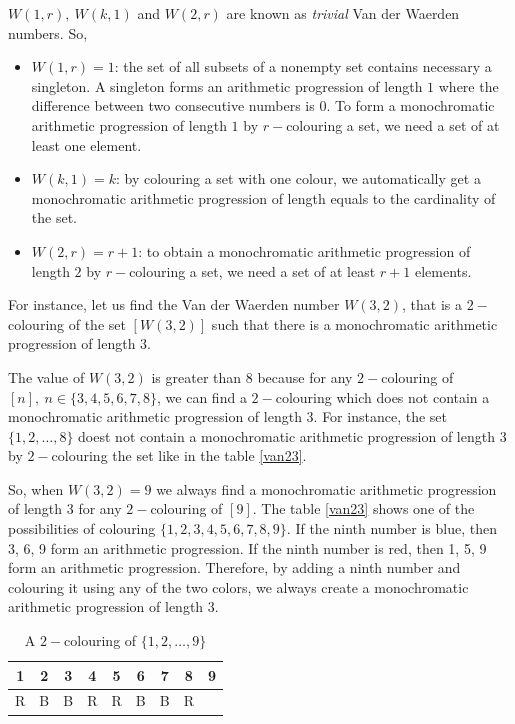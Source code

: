 $W(1,r), \ W(k,1)$ and $W(2,r)$ are known as \textit{trivial} Van der Waerden numbers. So, 
\begin{itemize}
\item $W(1,r)=1$:  the set of all subsets of a nonempty set contains necessary a singleton. A singleton forms an arithmetic progression of length $1$ where the difference between two consecutive numbers is $0.$ To form a monochromatic arithmetic progression of length $1$ by $r-$colouring a set, we need  a set of at least one element. 
\item $W(k,1)=k$: by colouring a set with one colour, we automatically get a monochromatic arithmetic progression of length equals to the cardinality  of the set.
\item $W(2,r)=r+1$: to obtain a monochromatic arithmetic progression of length $2$ by $r-$colouring a set, we need a set of at least $r+1$ elements.
\end{itemize}

For instance, let us find the Van der Waerden number $W(3,2)$, that is a $2-$colouring  of the set $[W(3,2)]$ such that there is a monochromatic arithmetic progression of length $3.$

The value of $W(3,2)$ is greater than $8$ because for any $2-$colouring of $[n],\ n\in \{3,4,5,6,7,8\}$, we can find a $2-$colouring which does not contain a monochromatic arithmetic progression of length 3. For instance, the set  $\{1,2,\ldots, 8\}$ doest not contain a monochromatic  arithmetic progression of length $3$ by $2-$colouring the set  like in the table \eqref{van23}.

So, when $W(3,2)=9$ we always find a monochromatic arithmetic progression of length 3 for any $2-$colouring of $[9].$ The table \eqref{van23} shows one of the possibilities of colouring $\{1,2,3,4,5,6,7,8,9\}.$  If the ninth number is {\color{blue} blue}, then{ \color{blue}3, 6, 9}  form an arithmetic progression. If the ninth number is {\color{red} red}, then {\color{red}1, 5, 9} form an arithmetic progression. Therefore, by adding a ninth number and colouring it using any of the two colors, we always create  a monochromatic arithmetic progression of length 3.

\begin{table}[h]
\begin{center}
\begin{tabular}{ccccccccc}
\hline
1 & 2 & 3 & 4  & 5 & 6 & 7 & 8 & 9 \\ \hline
\color{red}R & \color{blue}B & \color{blue}B & \color{red}R & \color{red}R & \color{blue}B & \color{blue}B & \color{red}R  & \\
\hline 
\end{tabular} 
\end{center}
\caption{A $2-$colouring of $\{1,2,\ldots, 9\}$} \label{van23}
\end{table}

